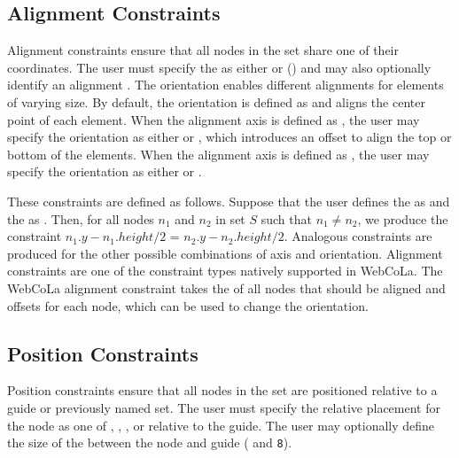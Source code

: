 \subsection{Alignment Constraints}
Alignment constraints ensure that all nodes in the set share one of their
coordinates. The user must specify the 
as either  or  () 
and may also optionally identify an alignment .
The orientation enables different alignments for elements of varying size. 
By default, the orientation is defined as 
and aligns the center point of each element. When the alignment axis is defined as ,
the user may specify the orientation as either  or , which introduces
an offset to align the top or bottom of the elements. When the alignment axis is 
defined as , the user may specify the orientation as either 
 or .

These constraints are defined as follows. Suppose that the user defines the 
as  and the  as .  Then, for all
nodes $n_1$ and $n_2$ in set $S$ such that $n_1 \neq n_2$, we produce the constraint
$n_1.y - n_1.height/2$ = $n_2.y - n_2.height/2$.
Analogous constraints are produced for the other possible combinations of axis and orientation.
Alignment constraints are one of the constraint types natively supported in
WebCoLa. The WebCoLa alignment constraint takes the  of all nodes
that should be aligned and offsets for each node, which can be used to change the orientation.

\vspace{-5px}
\subsection{Position Constraints}
Position constraints ensure that all nodes in the set are positioned relative to
a guide or previously named set. The user must specify the relative
placement for the node as one of , , 
, or  relative to the guide.
The user may optionally define the size of the 
between the node and guide ( and \texttt{8}).

